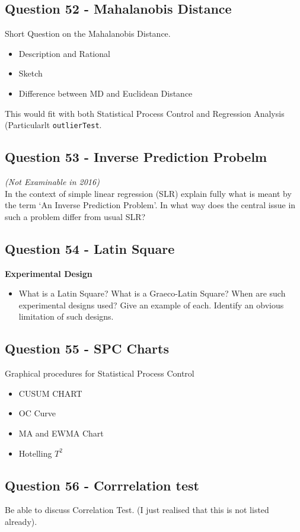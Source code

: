 \documentclass[a4paper,12pt]{article}
\begin{document}
\subsection*{Question 52 - Mahalanobis Distance} 
Short Question on the Mahalanobis Distance.
\begin{itemize}
	\item Description and Rational
	\item Sketch
	\item Difference between MD and Euclidean Distance
\end{itemize}
This would fit with both Statistical Process Control and Regression Analysis (Particularlt \texttt{outlierTest}.

\subsection*{Question 53 - Inverse Prediction Probelm}
\textit{(Not Examinable in 2016)} \\
In the context of simple linear regression (SLR) explain fully what is meant by the term ‘An Inverse Prediction Problem’. 
In what way does the central issue in such a problem differ from usual SLR? 

\subsection*{Question 54 - Latin Square} 
\textbf{Experimental Design}
\begin{itemize}
	\item What is a Latin Square? What is a Graeco-Latin Square? When are such experimental designs used? Give an example of each. Identify an obvious limitation of such designs.
\end{itemize}

\subsection*{Question 55 - SPC Charts}
Graphical procedures for Statistical Process Control
\begin{itemize}
	\item CUSUM CHART
	\item OC Curve
	\item MA and EWMA Chart
	\item Hotelling $T^2$
	
\end{itemize}

\subsection*{Question 56 - Corrrelation test}
Be able to discuss Correlation Test. (I just realised that this is not listed already).
\end{document}
